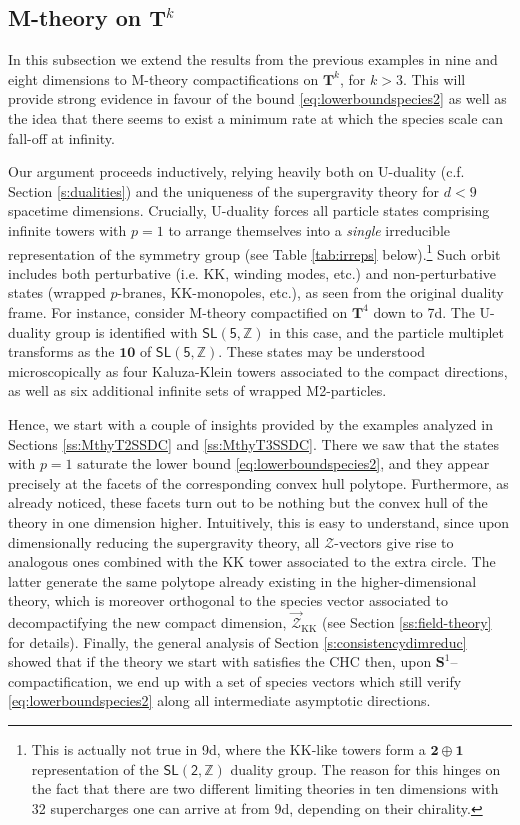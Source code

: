 \subsection{M-theory on $\mathbf{T}^k$}
\label{ss:MthyTk}

In this subsection we extend the results from the previous examples in nine and eight dimensions to M-theory compactifications on $\mathbf{T}^k$, for $k>3$. This will provide strong evidence in favour of the bound \eqref{eq:lowerboundspecies2} as well as the idea that there seems to exist a minimum rate at which the species scale can fall-off at infinity.

Our argument proceeds inductively, relying heavily both on U-duality (c.f. Section \ref{s:dualities}) and the uniqueness of the supergravity theory for $d<9$ spacetime dimensions. Crucially, U-duality forces all particle states comprising infinite towers with $p=1$ to arrange themselves into a \emph{single} irreducible representation of the symmetry group (see Table \ref{tab:irreps} below).\footnote{This is actually not true in 9d, where the KK-like towers form a $\mathbf{2} \oplus \mathbf{1}$ representation of the $\mathsf{SL(2, \mathbb{Z})}$ duality group. The reason for this hinges on the fact that there are two different limiting theories in ten dimensions with 32 supercharges one can arrive at from 9d, depending on their chirality\cite{Hull:1994ys}.} Such orbit includes both perturbative (i.e. KK, winding modes, etc.) and non-perturbative states (wrapped $p$-branes, KK-monopoles, etc.), as seen from the original duality frame. For instance, consider M-theory compactified on $\mathbf{T}^4$ down to 7d. The U-duality group is identified with $\mathsf{SL(5, \mathbb{Z})}$ in this case, and the particle multiplet transforms as the $\mathbf{10}$ of $\mathsf{SL(5, \mathbb{Z})}$. These states may be understood microscopically as four Kaluza-Klein towers associated to the compact directions, as well as six additional infinite sets of wrapped M2-particles.

Hence, we start with a couple of insights provided by the examples analyzed in Sections \ref{ss:MthyT2SSDC} and \ref{ss:MthyT3SSDC}. There we saw that the states with $p=1$ saturate the lower bound \eqref{eq:lowerboundspecies2}, and they appear precisely at the facets of the corresponding convex hull polytope. Furthermore, as already noticed, these facets turn out to be nothing but the convex hull of the theory in one dimension higher. Intuitively, this is easy to understand, since upon dimensionally reducing the supergravity theory, all $\mathcal{Z}$-vectors give rise to analogous ones combined with the KK tower associated to the extra circle. The latter generate the same polytope already existing in the higher-dimensional theory, which is moreover orthogonal to the species vector associated to decompactifying the new compact dimension, $\vec{\mathcal{Z}}_{\text{KK}}$ (see Section \ref{ss:field-theory} for details). Finally, the general analysis of Section \ref{s:consistencydimreduc} showed that if the theory we start with satisfies the CHC then, upon $\mathbf{S}^1$--\,compactification, we end up with a set of species vectors which still verify \eqref{eq:lowerboundspecies2} along all intermediate asymptotic directions.

